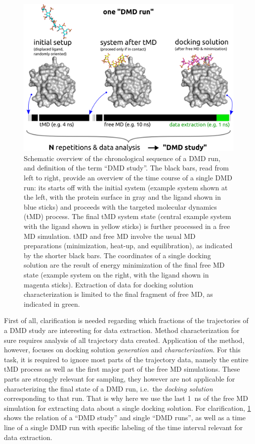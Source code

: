 \begin{figure}
\centering
\includegraphics[width=1.0\textwidth]{gfx/dmd/dmd_timeline_for_thesis_09.png}
\caption[]{
Schematic overview of the chronological sequence of a DMD run, and definition of
the term \enquote{DMD study}. The black bars, read from left to right, provide
an overview of the time course of a single DMD run: its starts off with the
initial system (example system shown at the left, with the protein surface in
gray and the ligand shown in blue sticks) and proceeds with the targeted
molecular dynamics (tMD) process. The final tMD system state (central example
system with the ligand shown in yellow sticks) is further processed in a free MD
simulation. tMD and free MD involve the usual MD preparations (minimization,
heat-up, and equilibration), as indicated by the shorter black bars. The
coordinates of a single docking solution are the result of energy minimization
of the final free MD state (example system on the right, with the ligand shown
in magenta sticks). Extraction of data for docking solution characterization is
limited to the final fragment of free MD, as indicated in green.}
\label{fig:dmd:timeline}
\end{figure}


First of all, clarification is needed regarding which fractions of the
trajectories of a DMD study are interesting for data extraction. Method
characterization for sure requires analysis of all trajectory data created.
Application of the method, however, focuses on docking solution
\textit{generation} and \textit{characterization}. For this task, it is required
to ignore most parts of the trajectory data, namely the entire tMD process as
well as the first major part of the free MD simulations. These parts are
strongly relevant for sampling, they however are not applicable for
characterizing the final state of a DMD run, i.e.\ the \textit{docking solution}
corresponding to that run. That is why here we use the last \SI{1}{\nano\second}
of the free MD simulation for extracting data about a single docking solution.
For clarification, \cref{fig:dmd:timeline} shows the relation of a \enquote{DMD
study} and single \enquote{DMD runs}, as well as a time line of a single DMD run
with specific labeling of the time interval relevant for data extraction.

